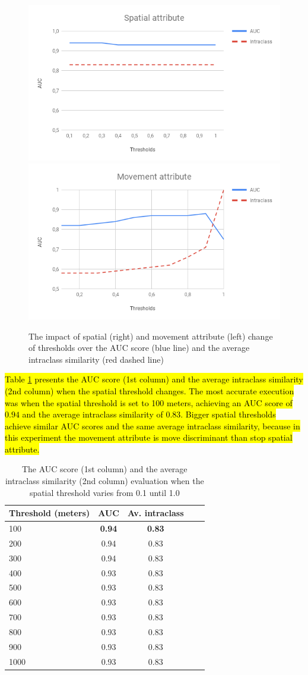 \documentclass[12pt]{article}
\begin{document}
\begin{figure}[ht!]
\centerline{
\centering
\includegraphics[width=.55\textwidth]{Images/StopMove_Spatial_attribute.png}
\includegraphics[width=.55\textwidth]{Images/StopMove_Movement_attribute.png}
}
\caption{The impact of spatial (right) and movement attribute (left) change of thresholds over the AUC score (blue line) and the average intraclass similarity (red dashed line)}
\label{fig:sensibility_thresholds}
\end{figure}

\hl{Table {\ref{tab:sensibility_spatial_thresholds}} presents the AUC score (1st column) and the average intraclass similarity (2nd column) when the spatial threshold changes. The most accurate execution was when the spatial threshold is set to 100 meters, achieving an AUC score of $0.94$ and the average intraclass similarity of $0.83$. Bigger spatial thresholds achieve similar AUC scores and the same average intraclass similarity, because in this experiment the movement attribute is move discriminant than stop spatial attribute.}

\begin{table}[ht!]
  \scriptsize
  \centering
  \begin{tabular}{|l|c|c|c|c|}
  	\hline
Threshold (meters) & AUC & Av. intraclass\\
  	\hline
100 & \textbf{0.94} & \textbf{0.83}\\
200 & 0.94 & 0.83\\
300 & 0.94 & 0.83\\
400 & 0.93 & 0.83\\
500 & 0.93 & 0.83\\
600 & 0.93 & 0.83\\
700 & 0.93 & 0.83\\
800 & 0.93 & 0.83\\
900 & 0.93 & 0.83\\
1000 & 0.93 & 0.83\\
    \hline
  \end{tabular}
  \caption{The AUC score (1st column) and the average intraclass similarity (2nd column) evaluation when the spatial threshold varies from 0.1 until 1.0}
  \label{tab:sensibility_spatial_thresholds}
\end{table}
\end{document}

